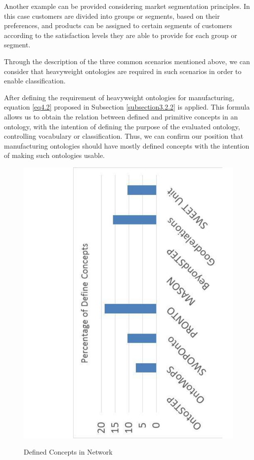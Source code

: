 Another example can be provided considering market segmentation principles. In this case customers are divided into groups or segments, based on their preferences, and products can be assigned to certain segments of customers according to the satisfaction levels they are able to provide for each group or segment. 

Through the description of the three common scenarios mentioned above, we can consider that heavyweight ontologies are required in such scenarios in order to enable classification. 

After defining the requirement of heavyweight ontologies for manufacturing, equation \ref{eq4.2} proposed in Subsection \ref{subsection3.2.2} is applied. This formula allows us to obtain the relation between defined and primitive concepts in an ontology, with the intention of defining the purpose of the evaluated ontology, controlling vocabulary or classification.  Thus, we can confirm our position that manufacturing ontologies should have mostly defined concepts with the intention of making such ontologies usable.   



\begin{figure}
\begin{center}
	\includegraphics[scale=0.5, angle=-90]{figure-chapterIV/fig4-29.pdf}\\
	\caption{Defined    Concepts in Network}
	\label{figure4-29}
\end{center}
\end{figure}



